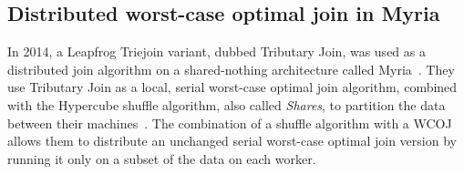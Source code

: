 


%


\subsection{Distributed worst-case optimal join in Myria} \label{subsec:myria}
In 2014, a Leapfrog Triejoin variant, dubbed Tributary Join, was used as a distributed join algorithm on a shared-nothing architecture called Myria~\cite{myria-detailed}.
They use Tributary Join as a local, serial worst-case optimal join algorithm, combined with the Hypercube shuffle algorithm, also called
\textit{Shares}, to partition the data between their machines~\cite{shares}.
The combination of a shuffle algorithm with a \textsc{WCOJ} allows them to distribute an unchanged serial worst-case optimal join
version by running it only on a subset of the data on each worker.

